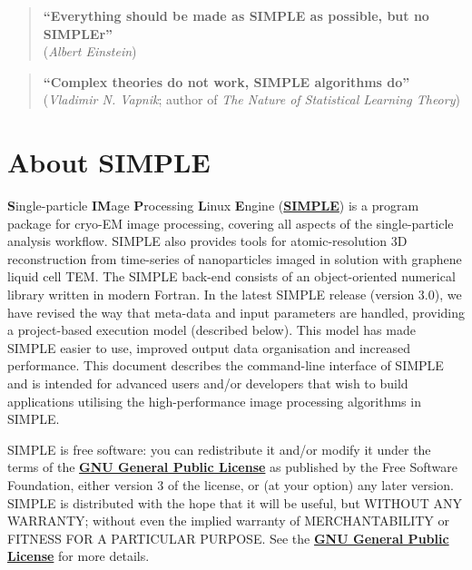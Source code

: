 \documentclass[a4paper,11pt]{article}
\begin{document}
\begin{quote}
\textbf{``Everything should be made as SIMPLE as possible, but no SIMPLEr''}\\(\textit{Albert Einstein})
\end{quote}

\begin{quote}
\textbf{``Complex theories do not work, SIMPLE algorithms do''}\\(\textit{Vladimir N. Vapnik}; author of \textit{The Nature of Statistical Learning Theory})
\end{quote}
\clearpage

\tableofcontents{}
\clearpage

\section{About SIMPLE}

\textbf{S}ingle-particle \textbf{IM}age \textbf{P}rocessing \textbf{L}inux \textbf{E}ngine (\href{www.simplecryoem.com}{\textbf{\textcolor{BurntOrange}{SIMPLE}}}) is a program package for cryo-EM image processing, covering all aspects of the single-particle analysis workflow. SIMPLE also provides tools for atomic-resolution 3D reconstruction from time-series of nanoparticles imaged in solution with graphene liquid cell TEM. The SIMPLE back-end consists of an object-oriented numerical library written in modern Fortran. In the latest SIMPLE release (version 3.0), we have revised the way that meta-data and input parameters are handled, providing a project-based execution model (described below). This model has made SIMPLE easier to use, improved output data organisation and increased performance. This document describes the command-line interface of SIMPLE and is intended for advanced users and/or developers that wish to build applications utilising the high-performance image processing algorithms in SIMPLE.
 
SIMPLE is free software: you can redistribute it and/or modify it under the terms of the \href{http://www.gnu.org/copyleft/gpl.html}{\textbf{\textcolor{BurntOrange}{GNU General Public License}}} as published by the Free Software Foundation, either version 3 of the license, or (at your option) any later version. SIMPLE is distributed with the hope that it will be useful, but WITHOUT ANY WARRANTY; without even the implied warranty of MERCHANTABILITY or FITNESS FOR A PARTICULAR PURPOSE. See the \href{http://www.gnu.org/copyleft/gpl.html}{\textbf{\textcolor{BurntOrange}{GNU General Public License}}} for more details.
\end{document}
